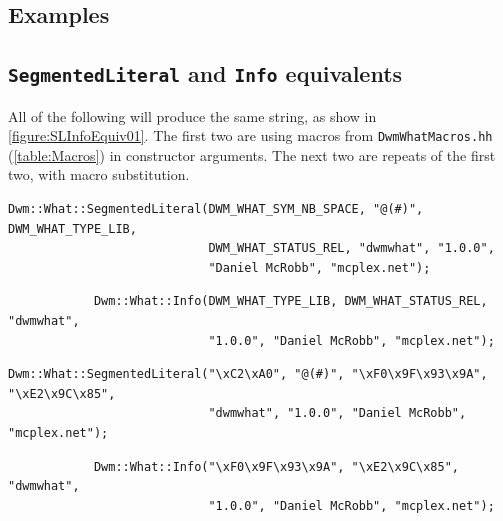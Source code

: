 \subsection{Examples}


\subsection{\texttt{SegmentedLiteral} and \texttt{Info} equivalents}

\begin{minipage}{\linewidth}
  All of the following will produce the same string, as show in
  \autoref{figure:SLInfoEquiv01}.  The first two are using macros from
  \texttt{DwmWhatMacros.hh} (\autoref{table:Macros}) in constructor
  arguments.  The next two are repeats of the first two, with macro
  substitution.

\begin{small}
\begin{verbatim}
Dwm::What::SegmentedLiteral(DWM_WHAT_SYM_NB_SPACE, "@(#)", DWM_WHAT_TYPE_LIB,
                            DWM_WHAT_STATUS_REL, "dwmwhat", "1.0.0",
                            "Daniel McRobb", "mcplex.net");
\end{verbatim}
\color{blue}
\begin{verbatim}
            Dwm::What::Info(DWM_WHAT_TYPE_LIB, DWM_WHAT_STATUS_REL, "dwmwhat",
                            "1.0.0", "Daniel McRobb", "mcplex.net");
\end{verbatim}
\color{black}

\begin{verbatim}
Dwm::What::SegmentedLiteral("\xC2\xA0", "@(#)", "\xF0\x9F\x93\x9A", "\xE2\x9C\x85",
                            "dwmwhat", "1.0.0", "Daniel McRobb", "mcplex.net");
\end{verbatim}
\color{blue}
\begin{verbatim}
            Dwm::What::Info("\xF0\x9F\x93\x9A", "\xE2\x9C\x85", "dwmwhat",
                            "1.0.0", "Daniel McRobb", "mcplex.net");
\end{verbatim}
\color{black}
\end{small}



\end{minipage}
